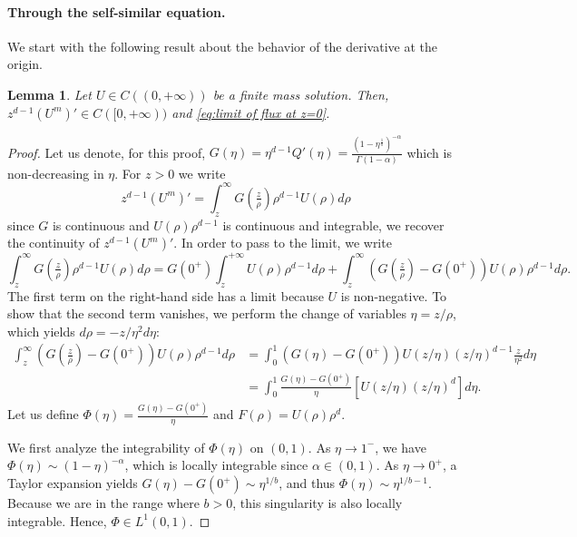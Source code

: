 \documentclass[a4paper]{article}
\newtheorem{lemma}[theorem]{Lemma}
\theoremstyle{definition}
\begin{document}
\paragraph{Through the self-similar equation.}
We start with the following result about the behavior of the derivative at the origin.
\begin{lemma}
  \label{lem:limit of flux holds}
  Let $U \in C((0,+\infty))$ be a finite mass solution.
  Then, $z^{d-1} (U^m)' \in C([0,+\infty))$ and \eqref{eq:limit of flux at z=0}.
\end{lemma}
\begin{proof}
  Let us denote, for this proof, $G(\eta) = \eta^{d-1} Q'(\eta) = \frac{(1-\eta^{\frac 1 b})^{-\alpha}}{\Gamma(1-\alpha)}$ which is non-decreasing in $\eta$.
  For $z > 0$ we write
  \[
    z^{d-1} (U^m)' =
    \int_z^\infty G(\tfrac z\rho) \rho^{d-1} U(\rho) d\rho
  \]
  since $G$ is continuous and $U(\rho) \rho^{d-1}$ is continuous and integrable, we recover the continuity of $z^{d-1} (U^m)'$.
  In order to pass to the limit, we write
  \begin{equation}
    \label{eq:limit of flux holds decomposition}
    \int_z^\infty G(\tfrac z\rho) \rho^{d-1} U(\rho) d\rho =
    G(0^+) \int_{z}^{+\infty} U(\rho) \rho^{d-1} d \rho + \int_z^\infty (G(\tfrac{z}{\rho}) - G(0^+)) U(\rho) \rho^{d-1}d\rho.
  \end{equation}
  The first term on the right-hand side has a limit because $U$ is non-negative.
  To show that the second term vanishes, we perform the change of variables $\eta = z/\rho$, which yields $d\rho = -z/\eta^2 d\eta$:
  \begin{align*}
    \int_z^\infty (G(\tfrac{z}{\rho}) - G(0^+)) U(\rho) \rho^{d-1}d\rho
    &= \int_0^1 (G(\eta) - G(0^+)) U(z/\eta) (z/\eta)^{d-1} \frac{z}{\eta^2} d\eta \\
    &= \int_0^1 \frac{G(\eta) - G(0^+)}{\eta} \left[ U(z/\eta) (z/\eta)^d \right] d\eta.
  \end{align*}
  Let us define $\Phi(\eta) = \frac{G(\eta) - G(0^+)}{\eta}$ and $F(\rho) = U(\rho)\rho^d$.

  We first analyze the integrability of $\Phi(\eta)$ on $(0,1)$. As $\eta \to 1^-$, we have $\Phi(\eta) \sim (1-\eta)^{-\alpha}$, which is locally integrable since $\alpha \in (0,1)$. As $\eta \to 0^+$, a Taylor expansion yields $G(\eta) - G(0^+) \sim \eta^{1/b}$, and thus $\Phi(\eta) \sim \eta^{1/b - 1}$. Because we are in the range where $b > 0$, this singularity is also locally integrable. Hence, $\Phi \in L^1(0,1)$.


\end{proof}
\end{document}
